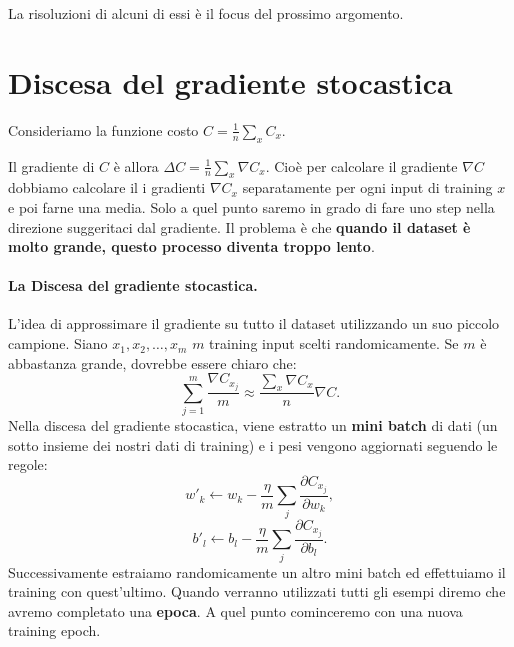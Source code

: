 La risoluzioni di alcuni di essi è il focus del prossimo argomento.
\section{Discesa del gradiente stocastica}
Consideriamo la funzione costo $C=\frac{1}{n}\sum_xC_x$.


Il gradiente di $C$ è allora $\Delta C=\frac{1}{n}\sum_x\nabla C_x$.
Cioè per calcolare il gradiente $\nabla C$ dobbiamo calcolare il i gradienti $\nabla C_x$ separatamente per ogni input di training $x$ e poi farne una media. Solo a quel punto saremo in grado di fare uno step nella direzione suggeritaci dal gradiente. Il problema è che \textbf{quando il dataset è molto grande, questo processo diventa troppo lento}.

\paragraph{La Discesa del gradiente stocastica.} L’idea di approssimare il gradiente su tutto il dataset utilizzando un suo piccolo campione. Siano $x_1,x_2,\dots,x_m$ $m$ training input scelti randomicamente. Se $m$ è abbastanza grande, dovrebbe essere chiaro che:
\begin{equation}
    \sum_{j=1}^m\frac{\nabla C_{x_j}}{m}\approx \frac{\sum_x\nabla C_x}{n}\nabla C.
\end{equation}
Nella discesa del gradiente stocastica, viene estratto un \textbf{mini batch} di dati (un sotto insieme dei nostri dati di training) e i pesi vengono aggiornati seguendo le regole:
\begin{equation}
    w'_k\leftarrow w_k-\frac{\eta}{m}\sum_j\frac{\partial C_{x_j}}{\partial w_k},
\end{equation}
\begin{equation}
    b'_l\leftarrow b_l-\frac{\eta}{m}\sum_j\frac{\partial C_{x_j}}{\partial b_l}.
\end{equation}
Successivamente estraiamo randomicamente un altro mini batch ed effettuiamo il training con quest’ultimo. Quando verranno utilizzati tutti gli esempi diremo che avremo completato una \textbf{epoca}. A quel punto cominceremo con una nuova training epoch.







